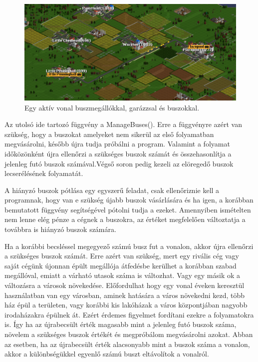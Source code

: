 \begin{figure}
	\centering
	\includegraphics[scale=0.45]{images/vonal.png}
	\caption{Egy aktív vonal buszmegállókkal, garázzsal és buszokkal.}
	\label{fig:vonal}
\end{figure}

Az utolsó ide tartozó függvény a ManageBuses(). Erre a függvényre azért van szükség, hogy a buszokat amelyeket nem sikerül az első folyamatban megvásárolni, később újra tudja próbálni a program. Valamint a folyamat időközönként újra ellenőrzi a szükséges buszok számát és összehasonlítja a jelenleg futó buszok számával.Végső soron pedig kezeli az elöregedő buszok lecserélésének folyamatát.

A hiányzó buszok pótlása egy egyszerű feladat, csak ellenőriznie kell a programnak, hogy van e szükség újabb buszok vásárlására és ha igen, a korábban bemutatott függvény segítségével pótolni tudja a ezeket. Amennyiben ismételten nem lenne elég pénze a cégnek a buszokra, az értéket megfelelően változtatja a továbbra is hiányzó buszok számára.

Ha a korábbi becsléssel megegyező számú busz fut a vonalon, akkor újra ellenőrzi a szükséges buszok számát. Erre azért van szükség, mert egy rivális cég vagy saját cégünk újonnan épült megállója átfedésbe kerülhet a korábban szabad megállóval, emiatt a várható utasok száma is változhat. Vagy egy másik ok a változásra a városok növekedése. Előfordulhat hogy egy vonal éveken keresztül használatban van egy városban, aminek hatására a város növekedni kezd, több ház épül a területen, vagy korábbi kis lakóházak a város központjában nagyobb irodaházakra épülnek át. Ezért érdemes figyelmet fordítani ezekre a folyamatokra is. Így ha az újrabecsült érték magasabb mint a jelenleg futó buszok száma, növelem a szükséges buszok értékét és megpróbálom megvásárolni azokat. Abban az esetben, ha az újrabecsült érték alacsonyabb mint a buszok száma a vonalon, akkor a különbségükkel egyenlő számú buszt eltávolítok a vonalról.

